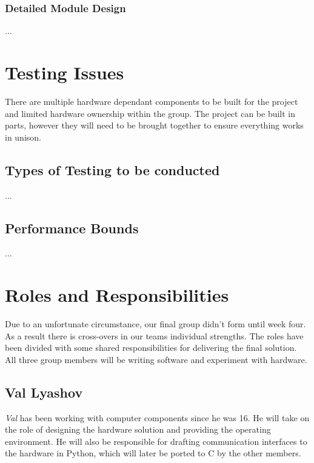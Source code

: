 \documentclass[11pt,a4paper,titlepage]{report}
\begin{document}
\subsubsection{Detailed Module Design}

{\color{red}...}


\section{Testing Issues}

There are multiple hardware dependant components to be built for the project and limited hardware ownership within the group. The project can be built in parts, however they will need to be brought together to ensure everything works in unison. 

\subsection{Types of Testing to be conducted}

{\color{red}...}

\subsection{Performance Bounds}

{\color{red}...}




\section{Roles and Responsibilities}



Due to an unfortunate circumstance, our final group didn't form until week four. As a result there is cross-overs in our teams individual strengths. The roles have been divided with some shared responsibilities for delivering the final solution. All three group members will be writing software and experiment with hardware.


\subsection{Val Lyashov}
\textit{Val} has been working with computer components since he was 16. He will take on the role of designing the hardware solution and providing the operating environment. He will also be responsible for drafting communication interfaces to the hardware in Python, which will later be ported to C by the other members.
\end{document}
